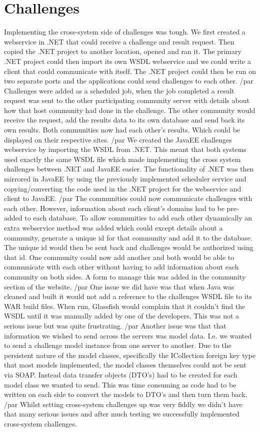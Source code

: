 \section{Challenges}
Implementing the cross-system side of challenges was tough. We first created a webservice in .NET that could receive a challenge and result request. Then copied the .NET project to another location, opened and ran it. The primary .NET project could then import its own WSDL webservice and we could write a client that could communicate with itself. The .NET project could then be run on two separate ports and the applications could send challenges to each other. /par
Challenges were added as a scheduled job, when the job completed a result request was sent to the other participating community server with details about how that host community had done in the challenge. The other community would receive the request, add the results data to its own database and send back its own results. Both communities now had each other’s results. Which could be displayed on their respective sites. /par
We created the JavaEE challenges webservice by importing the WSDL from .NET. This meant that both systems used exactly the same WSDL file which made implementing the cross system challenges between .NET and JavaEE easier. The functionality of .NET was then mirrored in JavaEE by using the previously implemented scheduler service and copying/converting the code used in the .NET project for the webservice and client to JavaEE. /par
The communities could now communicate challenges with each other. However, information about each client’s domains had to be pre-added to each database. To allow communities to add each other dynamically an extra webservice method was added which could except details about a community, generate a unique id for that community and add it to the database. The unique id would then be sent back and challenges would be authorized using that id. One community could now add another and both would be able to communicate with each other without having to add information about each community on both sides. A form to manage this was added in the community section of the website. /par
One issue we did have was that when Java was cleaned and built it would not add a reference to the challenges WSDL file to its WAR build files. When run, Glassfish would complain that it couldn’t find the WSDL until it was manually added by one of the developers. This was not a serious issue but was quite frustrating. /par
Another issue was that that information we wished to send across the servers was model data. I.e. we wanted to send a challenge model instance from one server to another. Due to the persistent nature of the model classes, specifically the ICollection foreign key type that most models implemented, the model classes themselves could not be sent via SOAP. Instead data transfer objects (DTO’s) had to be created for each model class we wanted to send. This was time consuming as code had to be written on each side to convert the models to DTO’s and then turn them back. /par
Whilst setting cross-system challenges up was very fiddly we didn’t have that many serious issues and after much testing we successfully implemented cross-system challenges.



